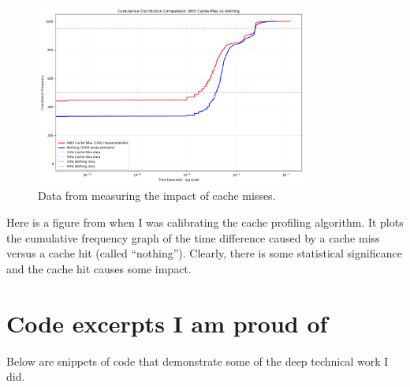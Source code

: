 \documentclass[a4paper,10pt,twocolumn]{article}
\theoremstyle{definition}
\begin{document}
\begin{figure}[h]
  \centering
  \includegraphics[width=0.8\textwidth]{../2025-07-20-comparison-nonsense.png}
  \caption{Data from measuring the impact of cache misses.}
\end{figure}

Here is a figure from when I was calibrating the cache profiling algorithm.
It plots the cumulative frequency graph of the time difference caused by a cache
miss versus a cache hit (called ``nothing'').
Clearly, there is some statistical significance and the cache hit causes some impact.


\section{Code excerpts I am proud of}

Below are snippets of code that demonstrate some of the deep technical work I did.
\end{document}
